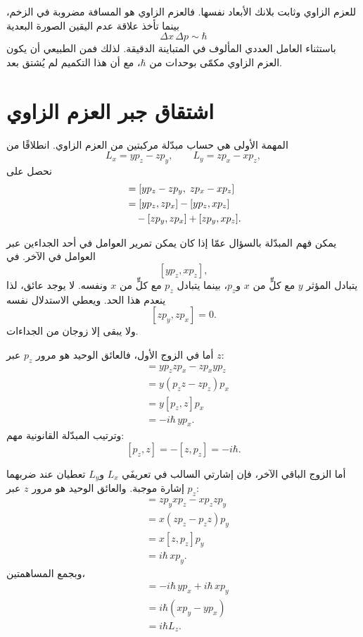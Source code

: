 للعزم الزاوي وثابت بلانك الأبعاد نفسها. فالعزم الزاوي هو المسافة مضروبة في الزخم، بينما تأخذ علاقة عدم اليقين الصورة البعدية
\begin{equation}
\Delta x\,\Delta p\sim\hbar
\end{equation}
باستثناء العامل العددي المألوف في المتباينة الدقيقة. لذلك فمن الطبيعي أن يكون العزم الزاوي مكمّى بوحدات من \(\hbar\)، مع أن هذا التكميم لم يُشتق بعد.

\section{اشتقاق جبر العزم الزاوي}

المهمة الأولى هي حساب مبدّلة مركبتين من العزم الزاوي. انطلاقًا من
\[
L_x=yp_z-zp_y,\qquad
L_y=zp_x-xp_z,
\]
نحصل على
\begin{align}
[L_x,L_y]
&=[yp_z-zp_y,\;zp_x-xp_z] \\
&=[yp_z,zp_x]-[yp_z,xp_z] \notag\\
&\quad{}-[zp_y,zp_x]+[zp_y,xp_z].
\end{align}

\begin{classroomqa}
\end{classroomqa}

يمكن فهم المبدّلة بالسؤال عمّا إذا كان يمكن تمرير العوامل في أحد الجداءين عبر العوامل في الآخر. في
\[
[yp_z,xp_z],
\]
يتبادل المؤثر \(y\) مع كلٍّ من \(x\) و\(p_z\)، بينما يتبادل \(p_z\) مع كلٍّ من \(x\) ونفسه. لا يوجد عائق، لذا ينعدم هذا الحد. ويعطي الاستدلال نفسه
\[
[zp_y,zp_x]=0.
\]
ولا يبقى إلا زوجان من الجداءات.

أما في الزوج الأول، فالعائق الوحيد هو مرور \(p_z\) عبر \(z\):
\begin{align}
[yp_z,zp_x]
&=yp_zzp_x-zp_xyp_z \\
&=y(p_zz-zp_z)p_x \\
&=y[p_z,z]p_x \\
&=-i\hbar\,yp_x.
\end{align}
وترتيب المبدّلة القانونية مهم:
\[
[p_z,z]=-[z,p_z]=-i\hbar.
\]

أما الزوج الباقي الآخر، فإن إشارتي السالب في تعريفَي \(L_x\) و\(L_y\) تعطيان عند ضربهما إشارة موجبة. والعائق الوحيد هو مرور \(z\) عبر \(p_z\):
\begin{align}
[zp_y,xp_z]
&=zp_yxp_z-xp_zzp_y \\
&=x(zp_z-p_zz)p_y \\
&=x[z,p_z]p_y \\
&=i\hbar\,xp_y.
\end{align}
وبجمع المساهمتين،
\begin{align}
[L_x,L_y]
&=-i\hbar\,yp_x+i\hbar\,xp_y \\
&=i\hbar(xp_y-yp_x) \\
&=i\hbar L_z.
\end{align}

